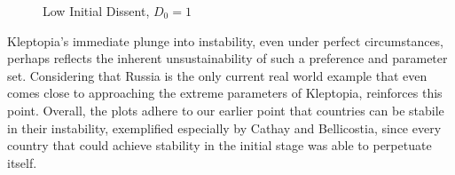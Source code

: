 \documentclass[12pt]{article}
\begin{document}
\begin{spacing}{1.5}
\begin{figure}[htb]
\centering 
\caption{Low Initial Dissent, $D_0=1$}
\end{figure}

Kleptopia's immediate plunge into instability, even under perfect circumstances, perhaps reflects the inherent unsustainability of such a preference and parameter set. Considering that Russia is the only current real world example that even comes close to approaching the extreme parameters of Kleptopia, reinforces this point. Overall, the plots adhere to our earlier point that countries can be stabile in their instability, exemplified especially by Cathay and Bellicostia, since every country that could achieve stability in the initial stage was able to perpetuate itself.   




\end{spacing}
\end{document}
